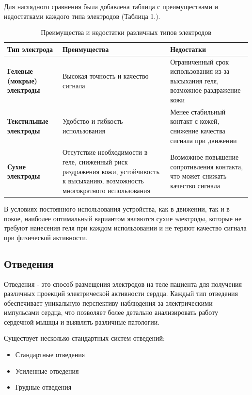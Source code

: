 \documentclass[12pt, russian]{extarticle}
\begin{document}
\begin{spacing}{1.5}
Для наглядного сравнения была добавлена таблица с преимуществами и недостатками каждого типа электродов (Таблица 1.).

\begin{table}[h!]
    \centering
    \begin{tabular}{| p{5cm} | p{5cm} | p{5cm} |}
    \hline
    \textbf{Тип электрода} & \textbf{Преимущества} & \textbf{Недостатки} \\
    \hline
    \textbf{Гелевые (мокрые) электроды} & Высокая точность и качество сигнала & Ограниченный срок использования из-за высыхания геля, возможное раздражение кожи \\
    \hline
    \textbf{Текстильные электроды} & Удобство и гибкость использования & Менее стабильный контакт с кожей, снижение качества сигнала при движении \\
    \hline
    \textbf{Сухие электроды} & Отсутствие необходимости в геле, сниженный риск раздражения кожи, устойчивость к высыханию, возможность многократного использования & Возможное повышение сопротивления контакта, что может снижать качество сигнала \\
    \hline
    \end{tabular}
    \caption{Преимущества и недостатки различных типов электродов}
    \label{table:electrodes}
    \end{table}

В условиях постоянного использования устройства, как в движении, так и в покое, наиболее оптимальный вариантом являются сухие электроды, которые не требуют нанесения геля при каждом использовании и не теряют качество сигнала при физической активности.

\subsection{Отведения}

Отведения - это способ размещения электродов на теле пациента для получения различных проекций электрической активности сердца. Каждый тип отведения обеспечивает уникальную перспективу наблюдения за электрическими импульсами сердца, что позволяет более детально анализировать работу сердечной мышцы и выявлять различные патологии. 

\noindent Существует несколько стандартных систем отведений:

\begin{itemize}
    \item Стандартные отведения
    \item Усиленные отведения
    \item Грудные отведения
\end{itemize}


\end{spacing}
\end{document}
